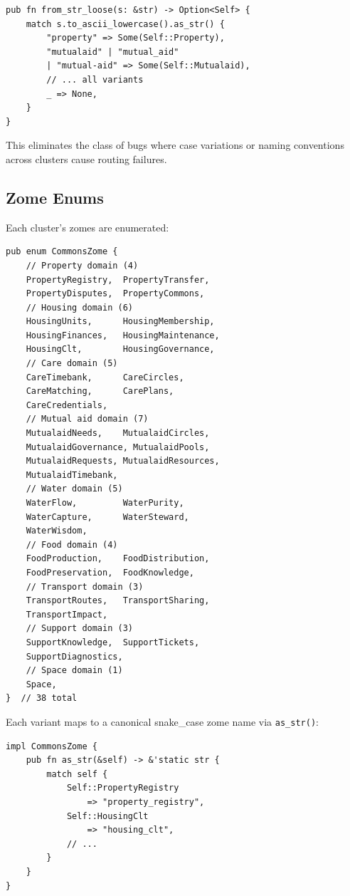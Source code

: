\documentclass[11pt,twocolumn]{article}
\begin{document}
\begin{lstlisting}
pub fn from_str_loose(s: &str) -> Option<Self> {
    match s.to_ascii_lowercase().as_str() {
        "property" => Some(Self::Property),
        "mutualaid" | "mutual_aid"
        | "mutual-aid" => Some(Self::Mutualaid),
        // ... all variants
        _ => None,
    }
}
\end{lstlisting}

This eliminates the class of bugs where case variations or naming
conventions across clusters cause routing failures.

\subsection{Zome Enums}

Each cluster's zomes are enumerated:

\begin{lstlisting}
pub enum CommonsZome {
    // Property domain (4)
    PropertyRegistry,  PropertyTransfer,
    PropertyDisputes,  PropertyCommons,
    // Housing domain (6)
    HousingUnits,      HousingMembership,
    HousingFinances,   HousingMaintenance,
    HousingClt,        HousingGovernance,
    // Care domain (5)
    CareTimebank,      CareCircles,
    CareMatching,      CarePlans,
    CareCredentials,
    // Mutual aid domain (7)
    MutualaidNeeds,    MutualaidCircles,
    MutualaidGovernance, MutualaidPools,
    MutualaidRequests, MutualaidResources,
    MutualaidTimebank,
    // Water domain (5)
    WaterFlow,         WaterPurity,
    WaterCapture,      WaterSteward,
    WaterWisdom,
    // Food domain (4)
    FoodProduction,    FoodDistribution,
    FoodPreservation,  FoodKnowledge,
    // Transport domain (3)
    TransportRoutes,   TransportSharing,
    TransportImpact,
    // Support domain (3)
    SupportKnowledge,  SupportTickets,
    SupportDiagnostics,
    // Space domain (1)
    Space,
}  // 38 total
\end{lstlisting}

Each variant maps to a canonical snake\_case zome name via \texttt{as\_str()}:

\begin{lstlisting}
impl CommonsZome {
    pub fn as_str(&self) -> &'static str {
        match self {
            Self::PropertyRegistry
                => "property_registry",
            Self::HousingClt
                => "housing_clt",
            // ...
        }
    }
}
\end{lstlisting}
\end{document}
